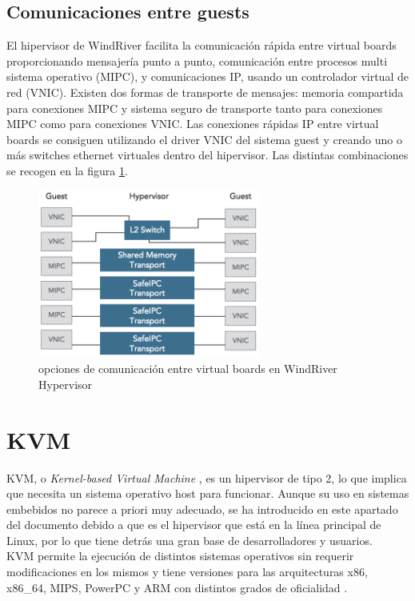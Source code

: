 \subsection{Comunicaciones entre guests}
El hipervisor de WindRiver facilita la comunicación rápida entre virtual boards proporcionando mensajería punto a punto, comunicación entre procesos multi sistema operativo (\acrshort{MIPC}), y comunicaciones IP, usando un controlador virtual de red (\acrshort{VNIC}). Existen dos formas de transporte de mensajes: memoria compartida para conexiones \acrshort{MIPC} y sistema seguro de transporte tanto para conexiones \acrshort{MIPC} como para conexiones \acrshort{VNIC}. Las conexiones rápidas IP entre virtual boards se consiguen utilizando el driver \acrshort{VNIC} del sistema guest y creando uno o más switches ethernet virtuales dentro del hipervisor. Las distintas combinaciones se recogen en la figura \ref{fig:windriver_com}.
\begin{figure}[!htb]
  \centering
  \includegraphics[width=0.65\textwidth]{recursos/windriver_com.png}
  \caption{opciones de comunicación entre virtual boards en WindRiver Hypervisor}
  \label{fig:windriver_com}
\end{figure}

\section{KVM}
KVM, o \textit{Kernel-based Virtual Machine} \cite{kvm_1}, es un hipervisor de tipo 2, lo que implica que necesita un sistema operativo host para funcionar. Aunque su uso en sistemas embebidos no parece a priori muy adecuado,
se ha introducido en este apartado del documento debido a que es el hipervisor que está en la línea principal de Linux, por lo que tiene detrás una gran base de desarrolladores y usuarios.\\
KVM permite la ejecución de distintos sistemas operativos sin requerir modificaciones en los mismos y tiene versiones para las arquitecturas x86, x86\_64, MIPS, PowerPC y ARM con distintos grados de oficialidad \cite{kvm_list}.


